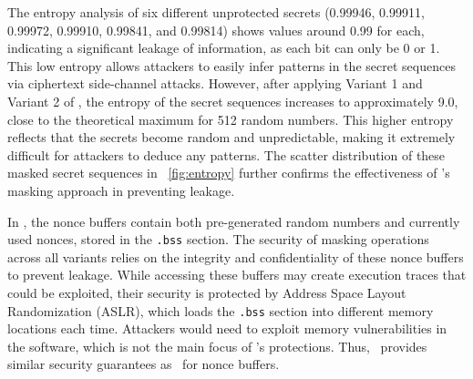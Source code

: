 The entropy analysis of six different unprotected secrets (0.99946, 0.99911, 0.99972, 0.99910, 0.99841, and 0.99814) shows values around 0.99 for each, indicating a significant leakage of information, as each bit can only be 0 or 1. 
This low entropy allows attackers to easily infer patterns in the secret sequences via ciphertext side-channel attacks. 
However, after applying Variant 1 and Variant 2 of \tool, the entropy of the secret sequences increases to approximately 9.0, close to the theoretical maximum for 512 random numbers. 
This higher entropy reflects that the secrets become random and unpredictable, making it extremely difficult for attackers to deduce any patterns. 
The scatter distribution of these masked secret sequences in \F~\ref{fig:entropy} further confirms the effectiveness of \tool's masking approach in preventing leakage.


In \tool, the nonce buffers contain both pre-generated random numbers and currently used nonces, stored in the \texttt{.bss} section. 
The security of masking operations across all variants relies on the integrity and confidentiality of these nonce buffers to prevent leakage. 
While accessing these buffers may create execution traces that could be exploited, their security is protected by Address Space Layout Randomization (ASLR), which loads the \texttt{.bss} section into different memory locations each time. 
Attackers would need to exploit memory vulnerabilities in the software, which is not the main focus of \tool's protections. 
Thus, \tool\ provides similar security guarantees as \ftool\ for nonce buffers.

